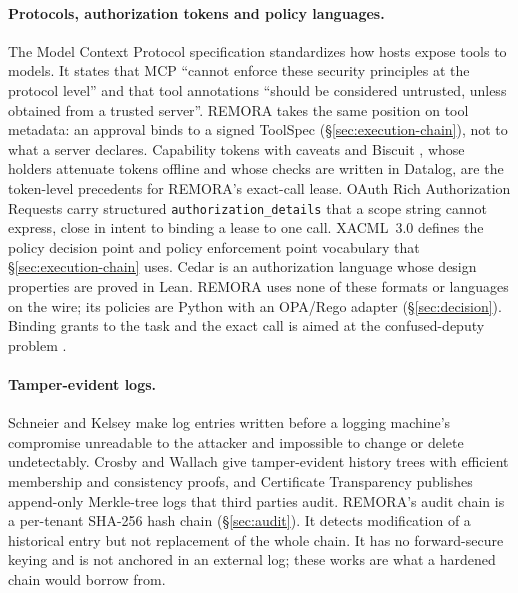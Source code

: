 \documentclass[10pt,twocolumn]{article}
\begin{document}
\paragraph{Protocols, authorization tokens and policy languages.}
The Model Context Protocol specification \cite{mcp2025spec} standardizes
how hosts expose tools to models. It states that MCP ``cannot enforce
these security principles at the protocol level'' and that tool
annotations ``should be considered untrusted, unless obtained from a
trusted server''. REMORA takes the same position on tool metadata: an
approval binds to a signed ToolSpec (\S\ref{sec:execution-chain}), not
to what a server declares. Capability tokens with caveats
\cite{birgisson2014macaroons} and Biscuit \cite{biscuit2026}, whose
holders attenuate tokens offline and whose checks are written in
Datalog, are the token-level precedents for REMORA's exact-call lease.
OAuth Rich Authorization Requests \cite{lodderstedt2023rar} carry
structured \texttt{authorization\_details} that a scope string cannot
express, close in intent to binding a lease to one call. XACML~3.0
\cite{oasis2013xacml} defines the policy decision point and policy
enforcement point vocabulary that \S\ref{sec:execution-chain} uses.
Cedar \cite{cutler2024cedar} is an authorization language whose design
properties are proved in Lean. REMORA uses none of these formats or
languages on the wire; its policies are Python with an OPA/Rego adapter
(\S\ref{sec:decision}). Binding grants to the task and the exact call
is aimed at the confused-deputy problem \cite{hardy1988confused}.

\paragraph{Tamper-evident logs.}
Schneier and Kelsey \cite{schneier1999secure} make log entries written
before a logging machine's compromise unreadable to the attacker and
impossible to change or delete undetectably. Crosby and Wallach
\cite{crosby2009tamper} give tamper-evident history trees with efficient
membership and consistency proofs, and Certificate Transparency
\cite{laurie2013ct,laurie2021ct} publishes append-only Merkle-tree logs
that third parties audit. REMORA's audit chain is a per-tenant SHA-256
hash chain (\S\ref{sec:audit}). It detects modification of a historical
entry but not replacement of the whole chain. It has no forward-secure
keying and is not anchored in an external log; these works are what a
hardened chain would borrow from.

\end{document}
